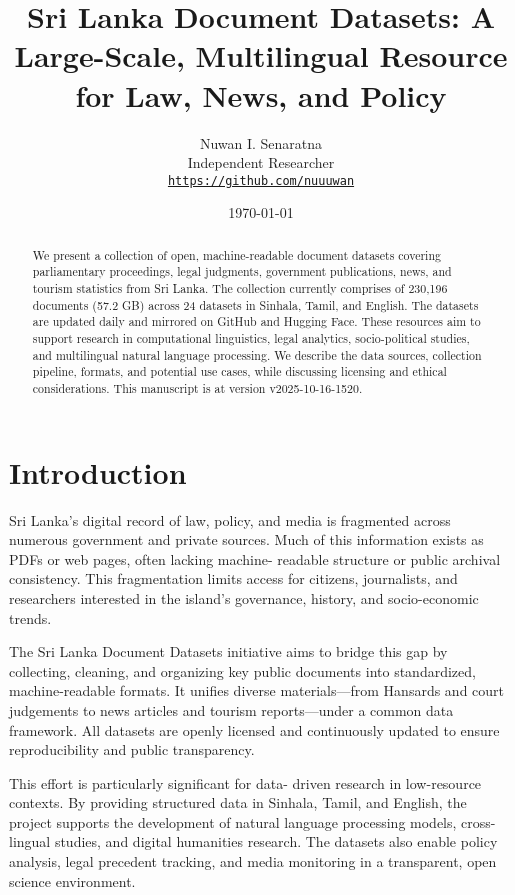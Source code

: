 \documentclass[10pt,a4paper]{article}%
\title{Sri Lanka Document Datasets: A Large{-}Scale, Multilingual Resource for Law, News, and Policy}%
\author{Nuwan I. Senaratna\\Independent Researcher\\\vspace{0.25em}\texttt{\href{https://github.com/nuuuwan}{https://github.com/nuuuwan}}}%
\date{\today}%
\begin{document}
%
\normalsize%
\maketitle%
\begin{abstract}%
We present a collection of open, machine-readable document datasets covering parliamentary proceedings, legal judgments, government publications, news, and tourism statistics from Sri Lanka. The collection currently comprises of  230,196  documents (57.2 GB) across 24  datasets in Sinhala, Tamil, and English. The datasets are updated daily and mirrored on GitHub and Hugging Face. These resources aim to support research in computational linguistics, legal analytics, socio-political studies, and multilingual natural language processing. We describe the data sources, collection pipeline, formats, and potential use cases, while discussing licensing and ethical considerations. This manuscript is at version v2025-10-16-1520.%

%
\end{abstract}%
\section{Introduction}%
\label{sec:Introduction}%
Sri Lanka’s digital record of law, policy, and media is fragmented across numerous government and private sources. Much of this information exists as PDFs or web pages, often lacking machine- readable structure or public archival consistency. This fragmentation limits access for citizens, journalists, and researchers interested in the island’s governance, history, and socio-economic trends.%

%
The Sri Lanka Document Datasets initiative aims to bridge this gap by collecting, cleaning, and organizing key public documents into standardized, machine-readable formats. It unifies diverse materials—from Hansards and court judgements to news articles and tourism reports—under a common data framework. All datasets are openly licensed and continuously updated to ensure reproducibility and public transparency.%

%
This effort is particularly significant for data- driven research in low-resource contexts. By providing structured data in Sinhala, Tamil, and English, the project supports the development of natural language processing models, cross-lingual studies, and digital humanities research. The datasets also enable policy analysis, legal precedent tracking, and media monitoring in a transparent, open science environment.%
\end{document}
